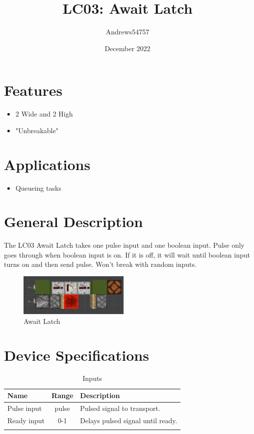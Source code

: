 \documentclass[10pt]{datasheet}
\title{LC03: Await Latch}
\author{Andrews54757}
\date{December 2022}
\begin{document}
\maketitle

\section{Features}

\begin{itemize}
\item{2 Wide and 2 High}
\item{"Unbreakable"}
\end{itemize}

\section{Applications}

\begin{itemize}
\item{Queueing tasks}
\end{itemize}

\section{General Description}
The LC03 Await Latch takes one pulse input and one boolean input. Pulse only goes through when boolean input is on. If it is off, it will wait until boolean input turns on and then send pulse. Won't break with random inputs.
\vfill\break

\begin{figure}[h]
    \centering
    \includegraphics[width=0.48\textwidth]{awaitlatch.png}
    \caption{\centering Await Latch}
\end{figure}

\onecolumn

\section{Device Specifications}

\begin{table}[h]
    \caption{Inputs}
    \begin{tabularx}{\textwidth}{l | c | X}
        \thickhline
        \textbf{Name} & \textbf{Range} & \textbf{Description} \\
        \hline
        Pulse input & pulse & Pulsed signal to transport. \\
        \hline
        Ready input & 0-1 & Delays pulsed signal until ready. \\
        \thickhline
\end{tabularx}
\end{table}
\end{document}

